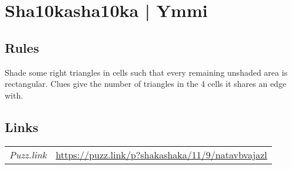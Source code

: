 \section[Sha10kasha10ka | Ymmi {[\emph{Shakashaka}]}]{Sha10kasha10ka | {\normalfont Ymmi}}
\label{sec:09-sha10kasha10ka-ymmi}

\subsection*{Rules}
\begin{markdown}
Shade some right triangles in cells such that every remaining unshaded area is rectangular. Clues give the number of triangles in the 4 cells it shares an edge with.
\end{markdown}
\subsection*{Links}
\begin{tabularx}{\textwidth}{l X}
\emph{Puzz.link} & \url{https://puzz.link/p?shakashaka/11/9/natavbvajazl} \\
\end{tabularx}
\pagebreak
